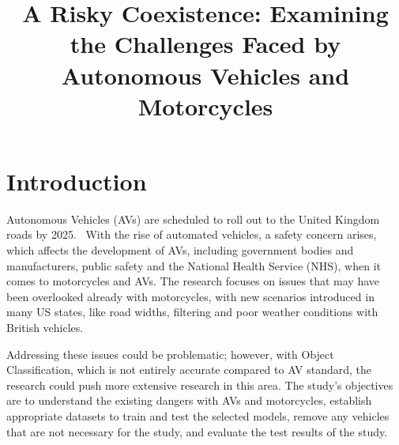 \documentclass[conference]{IEEEtran}
\begin{document}
\title{A Risky Coexistence: Examining the Challenges Faced by Autonomous Vehicles and Motorcycles}

\author{
	}

\maketitle
\thispagestyle{plain}
\pagestyle{plain}

\begin{abstract}

\end{abstract}

\begin{IEEEkeywords}
	
\end{IEEEkeywords}

\section{Introduction}
	 Autonomous Vehicles (AVs) are scheduled to roll out to the United Kingdom roads by 2025.~\cite{govuk_self-driving_2022} With the rise of automated vehicles, a safety concern arises, which affects the development of AVs, including government bodies and manufacturers, public safety and the National Health Service (NHS), when it comes to motorcycles and AVs. The research focuses on issues that may have been overlooked already with motorcycles, with new scenarios introduced in many US states, like road widths, filtering and poor weather conditions with British vehicles. 

	Addressing these issues could be problematic; however, with Object Classification, which is not entirely accurate compared to AV standard, the research could push more extensive research in this area. The study's objectives are to understand the existing dangers with AVs and motorcycles, establish appropriate datasets to train and test the selected models, remove any vehicles that are not necessary for the study, and evaluate the test results of the study.
	
\end{document}
